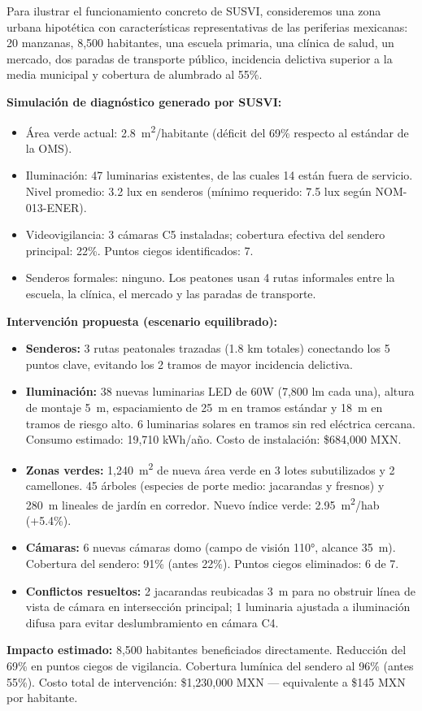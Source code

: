 \documentclass[12pt,a4paper]{article}
\begin{document}
Para ilustrar el funcionamiento concreto de SUSVI, consideremos una zona urbana hipotética con características representativas de las periferias mexicanas: 20 manzanas, 8,500 habitantes, una escuela primaria, una clínica de salud, un mercado, dos paradas de transporte público, incidencia delictiva superior a la media municipal y cobertura de alumbrado al 55\%.

\begin{narrativa}
\textbf{Simulación de diagnóstico generado por SUSVI:}
\begin{itemize}[leftmargin=0.5cm, itemsep=2pt]
    \item Área verde actual: 2.8~m\textsuperscript{2}/habitante (déficit del 69\% respecto al estándar de la OMS).
    \item Iluminación: 47 luminarias existentes, de las cuales 14 están fuera de servicio. Nivel promedio: 3.2 lux en senderos (mínimo requerido: 7.5 lux según NOM-013-ENER).
    \item Videovigilancia: 3 cámaras C5 instaladas; cobertura efectiva del sendero principal: 22\%. Puntos ciegos identificados: 7.
    \item Senderos formales: ninguno. Los peatones usan 4 rutas informales entre la escuela, la clínica, el mercado y las paradas de transporte.
\end{itemize}

\textbf{Intervención propuesta (escenario equilibrado):}
\begin{itemize}[leftmargin=0.5cm, itemsep=2pt]
    \item \textbf{Senderos:} 3 rutas peatonales trazadas (1.8 km totales) conectando los 5 puntos clave, evitando los 2 tramos de mayor incidencia delictiva.
    \item \textbf{Iluminación:} 38 nuevas luminarias LED de 60W (7,800 lm cada una), altura de montaje 5~m, espaciamiento de 25~m en tramos estándar y 18~m en tramos de riesgo alto. 6 luminarias solares en tramos sin red eléctrica cercana. Consumo estimado: 19,710 kWh/año. Costo de instalación: \$684,000 MXN.
    \item \textbf{Zonas verdes:} 1,240~m\textsuperscript{2} de nueva área verde en 3 lotes subutilizados y 2 camellones. 45 árboles (especies de porte medio: jacarandas y fresnos) y 280~m lineales de jardín en corredor. Nuevo índice verde: 2.95~m\textsuperscript{2}/hab (+5.4\%).
    \item \textbf{Cámaras:} 6 nuevas cámaras domo (campo de visión 110°, alcance 35~m). Cobertura del sendero: 91\% (antes 22\%). Puntos ciegos eliminados: 6 de 7.
    \item \textbf{Conflictos resueltos:} 2 jacarandas reubicadas 3~m para no obstruir línea de vista de cámara en intersección principal; 1 luminaria ajustada a iluminación difusa para evitar deslumbramiento en cámara C4.
\end{itemize}

\textbf{Impacto estimado:} 8,500 habitantes beneficiados directamente. Reducción del 69\% en puntos ciegos de vigilancia. Cobertura lumínica del sendero al 96\% (antes 55\%). Costo total de intervención: \$1,230,000 MXN — equivalente a \$145 MXN por habitante.
\end{narrativa}
\end{document}
